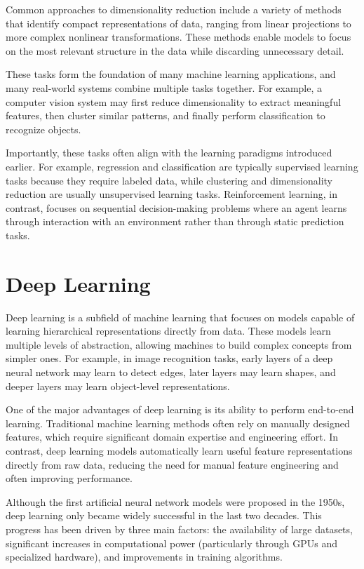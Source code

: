 \documentclass{article}
\begin{document}
Common approaches to dimensionality reduction include a variety of methods that identify compact representations of data, ranging from linear projections to more complex nonlinear transformations. These methods enable models to focus on the most relevant structure in the data while discarding unnecessary detail.

These tasks form the foundation of many machine learning applications, and many real-world systems combine multiple tasks together. For example, a computer vision system may first reduce dimensionality to extract meaningful features, then cluster similar patterns, and finally perform classification to recognize objects.

Importantly, these tasks often align with the learning paradigms introduced earlier. For example, regression and classification are typically supervised learning tasks because they require labeled data, while clustering and dimensionality reduction are usually unsupervised learning tasks. Reinforcement learning, in contrast, focuses on sequential decision-making problems where an agent learns through interaction with an environment rather than through static prediction tasks.

\section{Deep Learning}

Deep learning is a subfield of machine learning that focuses on models capable of learning hierarchical representations directly from data. These models learn multiple levels of abstraction, allowing machines to build complex concepts from simpler ones. For example, in image recognition tasks, early layers of a deep neural network may learn to detect edges, later layers may learn shapes, and deeper layers may learn object-level representations.

One of the major advantages of deep learning is its ability to perform end-to-end learning. Traditional machine learning methods often rely on manually designed features, which require significant domain expertise and engineering effort. In contrast, deep learning models automatically learn useful feature representations directly from raw data, reducing the need for manual feature engineering and often improving performance.

Although the first artificial neural network models were proposed in the 1950s, deep learning only became widely successful in the last two decades. This progress has been driven by three main factors: the availability of large datasets, significant increases in computational power (particularly through GPUs and specialized hardware), and improvements in training algorithms.
\end{document}

